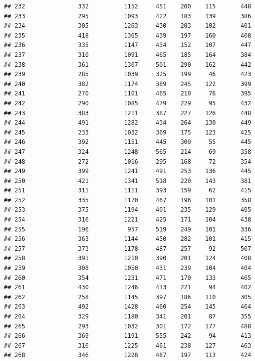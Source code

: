 \documentclass[]{book}
\begin{document}
\begin{verbatim}
## 232               332          1152     451    200    115       448
## 233               295          1093     422    183    139       386
## 234               305          1263     430    203    102       401
## 235               418          1365     439    197    160       408
## 236               335          1147     434    152    107       447
## 237               310          1091     465    185    164       384
## 238               361          1307     501    290    162       442
## 239               285          1039     325    199     46       423
## 240               382          1174     389    245    122       399
## 241               270          1101     465    210     76       395
## 242               290          1085     479    229     95       432
## 243               383          1211     387    227    126       448
## 244               491          1282     434    264    130       449
## 245               233          1032     369    175    123       425
## 246               392          1151     445    309     55       445
## 247               324          1248     565    214     69       358
## 248               272          1016     295    168     72       354
## 249               399          1241     491    253    136       445
## 250               421          1341     518    220    143       381
## 251               311          1111     393    159     62       415
## 252               335          1170     467    196    101       358
## 253               375          1194     401    235    129       405
## 254               316          1221     425    171    104       438
## 255               196           957     519    249    101       336
## 256               363          1144     450    282    101       415
## 257               373          1178     487    257     92       507
## 258               391          1210     390    201    124       408
## 259               308          1050     431    239    104       404
## 260               354          1231     471    170    133       465
## 261               430          1246     413    221     94       402
## 262               258          1145     397    186    110       305
## 263               492          1428     460    254    145       464
## 264               329          1180     341    201     87       355
## 265               293          1032     301    172    177       488
## 266               369          1191     555    242     94       413
## 267               316          1225     461    238    127       463
## 268               346          1228     487    197    113       424

\end{verbatim}
\end{document}
